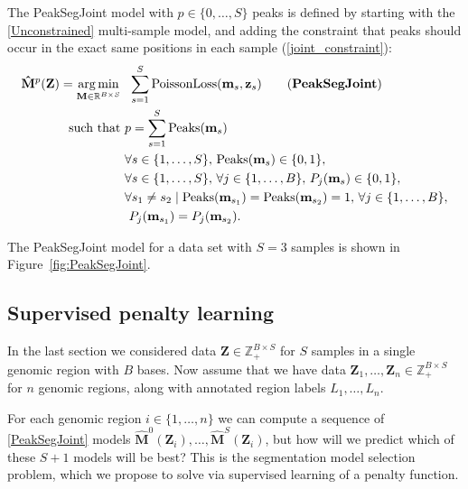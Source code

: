 \documentclass{article} %
\DeclareMathOperator*{\argmin}{arg\,min}
\DeclareMathOperator*{\Peaks}{Peaks}
\newcommand{\RR}{\mathbb R}
\newcommand{\ZZ}{\mathbb Z}
\begin{document}
The PeakSegJoint model with $p\in\{0, \dots, S\}$ peaks is defined by
starting with the \ref{Unconstrained} multi-sample model, and adding
the constraint that peaks should occur in the exact same positions in
each sample (\ref{joint_constraint}):
\begin{align}
  \label{PeakSegJoint}
  \mathbf{\hat M}^p(\mathbf Z)  =
  \argmin_{\mathbf M\in\RR^{B\times S}} &\ \ 
  \sum_{s=1}^S 
  \text{PoissonLoss}(\mathbf m_s, \mathbf z_s) 
  \tag{\textbf{PeakSegJoint}}
  \\
  \text{such that} &\ p = \sum_{s=1}^S \Peaks(\mathbf m_s)
  \nonumber
  \\
  &\ \forall s\in\{1, \dots, S\},\, 
  \Peaks(\mathbf m_s)\in\{0, 1\},  
  \nonumber
  \\
  &\ \forall s\in\{1, \dots, S\},\,
  \forall j\in\{1, \dots, B\},\, P_j(\mathbf m_s) \in\{0, 1\},
  \nonumber
  \\
  &\ \forall s_1\neq s_2\mid
  \nonumber
  \Peaks(\mathbf m_{s_1})=\Peaks(\mathbf  m_{s_2})=1,\,
  \forall j\in\{1, \dots, B\},\\
  &\ \ P_j(\mathbf m_{s_1}) = P_j(\mathbf m_{s_2}).
  \label{joint_constraint}
\end{align}

The PeakSegJoint model for a data set with $S=3$ samples is shown in
Figure~\ref{fig:PeakSegJoint}.

\subsection{Supervised penalty learning}

In the last section we considered data $\mathbf Z\in\ZZ_+^{B\times S}$
for $S$ samples in a single genomic region with $B$ bases. Now assume
that we have data $\mathbf Z_1,\dots, \mathbf Z_n\in\ZZ_+^{B\times S}$
for $n$ genomic regions, along with annotated region labels
$L_1,\dots, L_n$. 

For each genomic region $i\in\{1,\dots,n\}$ we can compute a sequence
of \ref{PeakSegJoint} models $\mathbf{\hat M}^0(\mathbf Z_i),\dots,
\mathbf{\hat M}^S(\mathbf Z_i)$, but how will we predict which of
these $S+1$ models will be best?
This is the segmentation model selection problem, which we propose to
solve via supervised learning of a penalty function.
\end{document}
